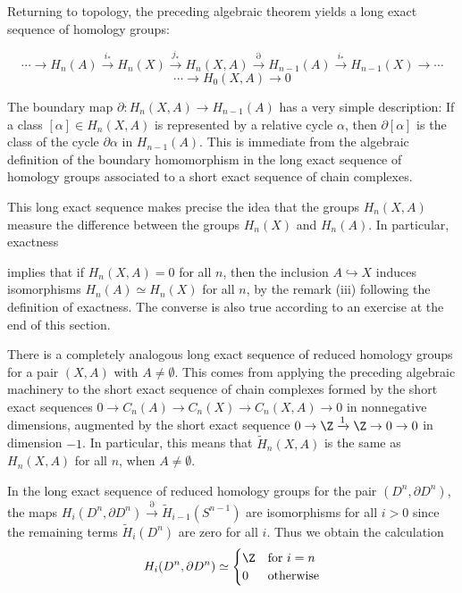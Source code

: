 Returning to topology, the preceding algebraic theorem yields a long exact sequence of homology groups:

\[
\cdots \to H_n(A) \xrightarrow{i_*} H_n(X) \xrightarrow{j_*} H_n(X,A) \xrightarrow{\partial} H_{n-1}(A) \xrightarrow{i_*} H_{n-1}(X) \to \cdots
\]
\[
\cdots \to H_0(X,A) \to 0
\]

The boundary map $\partial:H_n(X,A)\to H_{n-1}(A)$ has a very simple description: If a class $[\alpha] \in H_n(X,A)$ is represented by a relative cycle $\alpha$, then $\partial[\alpha]$ is the class of the cycle $\partial\alpha$ in $H_{n-1}(A)$. This is immediate from the algebraic definition of the boundary homomorphism in the long exact sequence of homology groups associated to a short exact sequence of chain complexes.

This long exact sequence makes precise the idea that the groups $H_n(X,A)$ measure the difference between the groups $H_n(X)$ and $H_n(A)$. In particular, exactness

implies that if $H_n(X,A) = 0$ for all $n$, then the inclusion $A\hookrightarrow X$ induces isomorphisms $H_n(A) \simeq H_n(X)$ for all $n$, by the remark (iii) following the definition of exactness. The converse is also true according to an exercise at the end of this section.

There is a completely analogous long exact sequence of reduced homology groups for a pair $(X,A)$ with $A \ne \emptyset$. This comes from applying the preceding algebraic machinery to the short exact sequence of chain complexes formed by the short exact sequences $0\to C_n(A)\to C_n(X)\to C_n(X,A)\to 0$ in nonnegative dimensions, augmented by the short exact sequence $0 \to \Z \xrightarrow{1} \Z \to 0 \to 0$ in dimension $-1$. In particular, this means that $\tilde H_n(X,A)$ is the same as $H_n(X,A)$ for all $n$, when $A \ne \emptyset$.

\begin{example}
\label{ex:long-exact-sequence-disk-sphere}
In the long exact sequence of reduced homology groups for the pair $(D^n,\partial D^n)$, the maps $H_i(D^n,\partial D^n) \xrightarrow{\partial} \tilde H_{i-1}(S^{n-1})$ are isomorphisms for all $i > 0$ since the remaining terms $\tilde H_i(D^n)$ are zero for all $i$. Thus we obtain the calculation
\[
H_i(D^n,\partial D^n) \simeq \begin{cases}
\Z & \text{for } i = n \\
0 & \text{otherwise}
\end{cases}
\]
\end{example}

